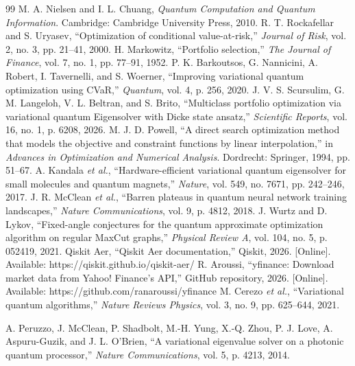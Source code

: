 \documentclass[runningheads]{llncs}
\begin{document}
\begin{thebibliography}{99}
M. A. Nielsen and I. L. Chuang, \textit{Quantum Computation 
and Quantum Information}. Cambridge: Cambridge University 
Press, 2010.
R. T. Rockafellar and S. Uryasev, ``Optimization of conditional 
value-at-risk,'' \textit{Journal of Risk}, vol. 2, no. 3, 
pp. 21--41, 2000.
H. Markowitz, ``Portfolio selection,'' \textit{The Journal 
of Finance}, vol. 7, no. 1, pp. 77--91, 1952.
P. K. Barkoutsos, G. Nannicini, A. Robert, I. Tavernelli, 
and S. Woerner, ``Improving variational quantum optimization 
using CVaR,'' \textit{Quantum}, vol. 4, p. 256, 2020.
J. V. S. Scursulim, G. M. Langeloh, V. L. Beltran, and
S. Brito, ``Multiclass portfolio optimization via variational
quantum Eigensolver with Dicke state ansatz,''
\textit{Scientific Reports}, vol. 16, no. 1, p. 6208, 2026.
M. J. D. Powell, ``A direct search optimization method 
that models the objective and constraint functions by 
linear interpolation,'' in \textit{Advances in 
Optimization and Numerical Analysis}. Dordrecht: 
Springer, 1994, pp. 51--67.
A. Kandala \textit{et al.}, ``Hardware-efficient variational quantum eigensolver for small molecules and quantum magnets,'' \textit{Nature}, vol. 549, no. 7671, pp. 242--246, 2017.
J. R. McClean \textit{et al.}, ``Barren plateaus in quantum neural network training landscapes,'' \textit{Nature Communications}, vol. 9, p. 4812, 2018.
J. Wurtz and D. Lykov, ``Fixed-angle conjectures for the quantum approximate optimization algorithm on regular MaxCut graphs,'' \textit{Physical Review A}, vol. 104, no. 5, p. 052419, 2021.
Qiskit Aer, ``Qiskit Aer documentation,'' Qiskit, 2026.
[Online]. Available: https://qiskit.github.io/qiskit-aer/
R. Aroussi, ``yfinance: Download market data from Yahoo! Finance's API,'' GitHub repository, 2026. [Online]. Available: https://github.com/ranaroussi/yfinance
M. Cerezo \textit{et al.}, ``Variational quantum algorithms,''
\textit{Nature Reviews Physics}, vol. 3, no. 9, pp. 625--644, 2021.

A. Peruzzo, J. McClean, P. Shadbolt, M.-H. Yung, X.-Q. Zhou,
P. J. Love, A. Aspuru-Guzik, and J. L. O'Brien,
``A variational eigenvalue solver on a photonic quantum processor,''
\textit{Nature Communications}, vol. 5, p. 4213, 2014.


\end{thebibliography}
\end{document}
